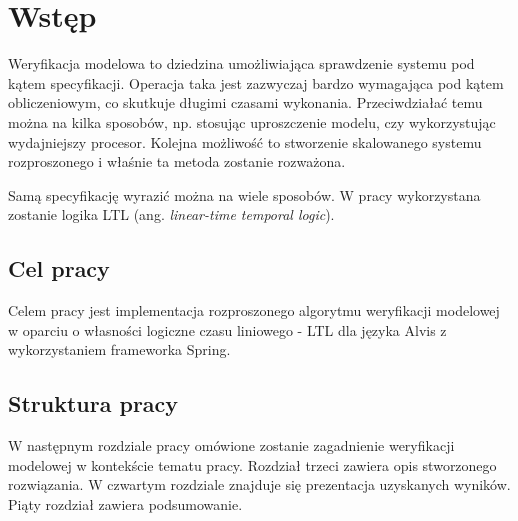 \chapter{Wstęp}

Weryfikacja modelowa to dziedzina umożliwiająca sprawdzenie systemu pod kątem specyfikacji.
Operacja taka jest zazwyczaj bardzo wymagająca pod kątem obliczeniowym, co skutkuje długimi czasami wykonania. Przeciwdziałać temu można na kilka sposobów, np. stosując uproszczenie modelu, czy wykorzystując wydajniejszy procesor. Kolejna możliwość to stworzenie skalowanego systemu rozproszonego i właśnie ta metoda zostanie rozważona.

Samą specyfikację wyrazić można na wiele sposobów. W pracy wykorzystana zostanie logika LTL (ang. \textit{linear-time temporal logic}).


\section{Cel pracy}

Celem pracy jest implementacja rozproszonego algorytmu weryfikacji modelowej w oparciu o własności logiczne czasu liniowego - LTL dla języka Alvis z wykorzystaniem frameworka Spring.


\section{Struktura pracy}

W następnym rozdziale pracy omówione zostanie zagadnienie weryfikacji modelowej w kontekście tematu pracy.
Rozdział trzeci zawiera opis stworzonego rozwiązania.
W czwartym rozdziale znajduje się prezentacja uzyskanych wyników.
Piąty rozdział zawiera podsumowanie.
